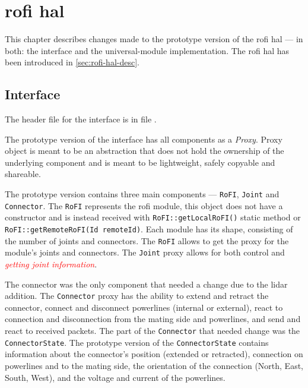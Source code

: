 \documentclass[
  digital,     %
  oneside,     %
  nosansbold,  %
  nocolorbold, %
  nolof,         %
  nolot,         %
]{fithesis4}
\newcommand{\TODO}[1]{\textcolor{red}{\textit{#1}}}
\newcommand{\TODOLIST}[1]{}
\begin{document}
{{{\chapter[ RoFI Hardware Abstraction Layer ]{ \acrshort{rofi} \acrlong{hal} } \label{ch:rofi-hal}

This chapter describes changes made to the prototype version of the \acrshort{rofi} \acrshort{hal} --- in both: the interface and the \gls{universal-module} implementation. The \acrshort{rofi} \acrshort{hal} has been introduced in \autoref{sec:rofi-hal-desc}.

\section{Interface} \label{sec:rofi-hal-interface}

\TODOLIST{
\begin{itemize}
    \item Current interface components - RoFI, joint, connector
    \item \textbf{Proxy} 
    \item Changes done --- Added distance and status
\end{itemize}
}

The header file for the interface is in file .

The prototype version of the interface has all components as a \emph{Proxy}. Proxy object is meant to be an abstraction that does not hold the ownership of the underlying component and is meant to be lightweight, safely copyable and shareable.

The prototype version contains three main components --- \lstinline[breakatwhitespace]|RoFI|, \lstinline|Joint| and \lstinline|Connector|. The \lstinline|RoFI| represents the \acrshort{rofi} module, this object does not have a constructor and is instead received with \lstinline|RoFI::getLocalRoFI()| static method or \lstinline|RoFI::getRemoteRoFI(Id remoteId)|. Each module has its shape, consisting of the number of joints and connectors. The \lstinline|RoFI| allows to get the proxy for the module's joints and connectors. The \lstinline|Joint| proxy allows for both control and \TODO{getting joint information}.

The connector was the only component that needed a change due to the \acrshort{lidar} addition. The \lstinline|Connector| proxy has the ability to extend and retract the connector, connect and disconnect powerlines (internal or external), react to connection and disconnection from the mating side and powerlines, and send and react to received packets. The part of the \lstinline|Connector| that needed change was the \lstinline|ConnectorState|. The prototype version of the \lstinline|ConnectorState| contains information about the connector's position (extended or retracted), connection on powerlines and to the mating side, the orientation of the connection (North, East, South, West), and the voltage and current of the powerlines.

}}}
\end{document}
